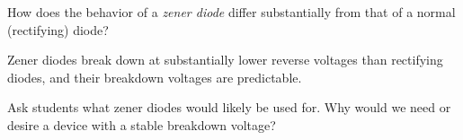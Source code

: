 

How does the behavior of a {\it zener diode} differ substantially from that of a normal (rectifying) diode?







Zener diodes break down at substantially lower reverse voltages than rectifying diodes, and their breakdown voltages are predictable.







Ask students what zener diodes would likely be used for.  Why would we need or desire a device with a stable breakdown voltage?





